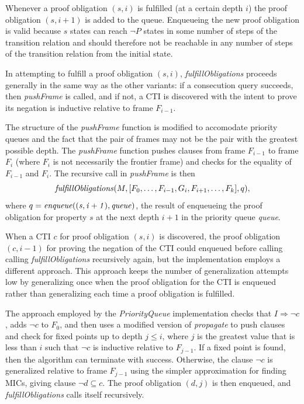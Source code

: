 \documentclass[12pt,a4paper,twoside,openright]{report}
\begin{document}
{Whenever a proof obligation $(s,i)$ is fulfilled (at a certain depth $i$) the proof obligation
$(s, i + 1)$ is added to the queue. Enqueueing the new proof obligation is valid
because $s$ states can reach $\neg P$ states in some
number of steps of the transition relation and should therefore
not be reachable in any number of steps of the transition relation from the initial state.

In attempting to fulfill a proof obligation $(s,i)$, {\it fulfillObligations} proceeds
generally in the same way as the other variants: if a consecution query succeeds,
then {\it pushFrame} is called, and if not, a CTI is discovered with the intent to
prove its negation is inductive relative to frame $F_{i - 1}$.

The structure of the {\it pushFrame} function is modified to accomodate priority queues
and the fact that the pair of frames may not be the pair with the greatest possible depth.
The {\it pushFrame} function pushes clauses from frame $F_{i - 1}$ to frame $F_i$ (where
$F_i$ is not necessarily the frontier frame) and checks
for the equality of $F_{i - 1}$ and $F_i$.
The recursive call in {\it pushFrame} is then
$${\it fulfillObligations}(M,[F_0,\ldots,F_{i - 1},G_i,F_{i + 1}, \ldots, F_k], q),$$
where $q = {\it enqueue((s, i+1), queue)}$, the result of enqueueing the proof obligation
for property $s$ at the next depth $i + 1$ in the priority queue {\it queue}.

When a CTI $c$ for proof obligation $(s,i)$ is discovered, the proof obligation $(c,i - 1)$
for proving the negation of the CTI could enqueued before calling
calling {\it fulfillObligations} recursively again,
but the implementation employs a different approach.
This approach keeps the number of
generalization attempts low by generalizing once when the proof obligation
for the CTI is enqueued rather than generalizing each time a proof obligation
is fulfilled.

The approach employed by the {\it PriorityQueue} implementation checks
that $I \Rightarrow \neg c$, adds $\neg c$ to $F_0$, and then uses a modified
version of {\it propagate} to push clauses and check for fixed points up to
depth $j \leq i$, where $j$ is the greatest value that is less than $i$
such that $\neg c$ is inductive relative to $F_{j - 1}$. If a fixed point is
found, then the algorithm can terminate with success. Otherwise, the clause
$\neg c$ is generalized relative to frame $F_{j - 1}$
using the simpler approximation for finding MICs, giving clause
$\neg d \subseteq c$. The proof obligation $(d,j)$ is then enqueued, and
{\it fulfillObligations} calls itself recursively.

}
\end{document}
